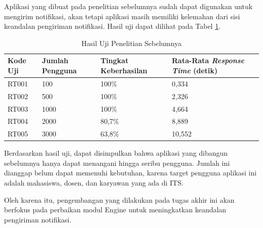 \par Aplikasi yang dibuat pada penelitian sebelumnya sudah dapat digunakan untuk mengirim notifikasi, akan tetapi aplikasi masih memiliki kelemahan dari sisi keandalan pengiriman notifikasi. Hasil uji dapat dilihat pada Tabel \ref{t:hasil_uji_sebelum}.
\begin{longtable}{|p{1.5cm}|p{2cm}|p{2cm}|p{2.5cm}|}
	\caption{Hasil Uji Penelitian Sebelumnya \cite{application-thesis}} \label{t:hasil_uji_sebelum} \\ \hline
	\rowcolor{lightgray} Kode Uji & Jumlah Pengguna & Tingkat Keberhasilan & Rata-Rata \textit{Response Time} (detik) \\ \hline
	RT001 & 100 & 100\% & 0,334 \\ \hline
	RT002 & 500 & 100\% & 2,326 \\ \hline
	RT003 & 1000 & 100\% & 4,664 \\ \hline
	RT004 & 2000 & 80,7\% & 8,889 \\ \hline
	RT005 & 3000 & 63,8\% & 10,552 \\ \hline
\end{longtable}
\par Berdasarkan hasil uji, dapat disimpulkan bahwa aplikasi yang dibangun sebelumnya hanya dapat menangani hingga seribu pengguna. Jumlah ini dianggap belum dapat memenuhi kebutuhan, karena target pengguna aplikasi ini adalah mahasiswa, dosen, dan karyawan yang ada di ITS.
\par Oleh karena itu, pengembangan yang dilakukan pada tugas akhir ini akan berfokus pada perbaikan modul Engine untuk meningkatkan keandalan pengiriman notifikasi.

